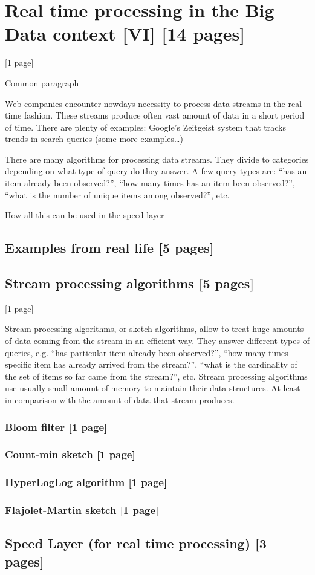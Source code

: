 \chapter{Real time processing in the Big Data context [VI] [14 pages]}
\label{chap:real_time_processing}

[1 page]

Common paragraph

Web-companies encounter nowdays necessity to process data streams in the real-time fashion.
These streams produce often vast amount of data in a short period of time.
There are plenty of examples: Google's Zeitgeist system that tracks trends in search queries (some more examples\ldots)

There are many algorithms for processing data streams.
They divide to categories depending on what type of query do they answer.
A few query types are: ``has an item already been observed?'', ``how many times has an item been observed?'', ``what is the number of unique items among observed?'', etc.

How all this can be used in the speed layer

\section{Examples from real life [5 pages]}

\section{Stream processing algorithms [5 pages]}

[1 page]

Stream processing algorithms, or sketch algorithms, allow to treat huge amounts of data coming from the stream in an efficient way.
They answer different types of queries, e.g. ``has particular item already been observed?'', ``how many times specific item has already arrived from the stream?'', ``what is the cardinality of the set of items so far came from the stream?'', etc.
Stream processing algorithms use usually small amount of memory to maintain their data structures.
At least in comparison with the amount of data that stream produces.

\subsection{Bloom filter [1 page]}
\subsection{Count-min sketch [1 page]}
\subsection{HyperLogLog algorithm [1 page]}
\subsection{Flajolet-Martin sketch [1 page]}

\section{Speed Layer (for real time processing) [3 pages]}